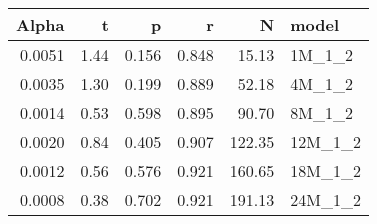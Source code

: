 \begin{table}[ht]
\centering
\begin{tabular}{rrrrrl}
  \hline
Alpha & t & p & r & N & model \\ 
  \hline
0.0051 & 1.44 & 0.156 & 0.848 & 15.13 & 1M\_1\_2 \\ 
  0.0035 & 1.30 & 0.199 & 0.889 & 52.18 & 4M\_1\_2 \\ 
  0.0014 & 0.53 & 0.598 & 0.895 & 90.70 & 8M\_1\_2 \\ 
  0.0020 & 0.84 & 0.405 & 0.907 & 122.35 & 12M\_1\_2 \\ 
  0.0012 & 0.56 & 0.576 & 0.921 & 160.65 & 18M\_1\_2 \\ 
  0.0008 & 0.38 & 0.702 & 0.921 & 191.13 & 24M\_1\_2 \\ 
   \hline
\end{tabular}
\end{table}

